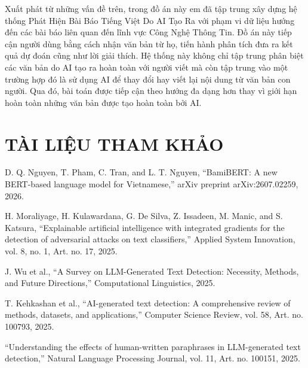 \documentclass[12pt,a4paper]{report}
\begin{document}
\vspace{\baselineskip}
\noindent
Xuất phát từ những vấn đề trên, trong đồ án này em đã tập trung xây dựng hệ thống Phát Hiện Bài Báo Tiếng Việt Do AI Tạo Ra với phạm vi dữ liệu hướng đến các bài báo liên quan đến lĩnh vực
Công Nghệ Thông Tin. Đồ án này tiếp cận người dùng bằng cách nhận văn bản từ họ, tiến hành phân tích đưa ra kết quả dự đoán cũng như lời giải thích. Hệ thống này không chỉ tập trung phân biệt các văn 
bản do AI tạo ra hoàn toàn với người viết mà còn tập trung vào một trường hợp đó là sử dụng AI để thay đổi hay viết lại nội dung từ văn bản con người. Qua đó, bài toán được tiếp cận theo hướng đa dạng hơn
thay vì giới hạn hoàn toàn những văn bản được tạo hoàn toàn bởi AI.

\clearpage
{}







\chapter*{TÀI LIỆU THAM KHẢO}
\begin{enumerate}[label={[\arabic*]}, leftmargin=1.2cm, labelsep=0.3cm, itemsep=0.45\baselineskip, topsep=0.2\baselineskip, parsep=0pt]
    \item D. Q. Nguyen, T. Pham, C. Tran, and L. T. Nguyen, “BamiBERT: A new BERT-based language model for Vietnamese,” arXiv preprint arXiv:2607.02259, 2026.
    \item H. Moraliyage, H. Kulawardana, G. De Silva, Z. Issadeen, M. Manic, and S. Katsura, “Explainable artificial intelligence with integrated gradients for the detection of adversarial attacks on text classifiers,” Applied System Innovation, vol. 8, no. 1, Art. no. 17, 2025.
    \item J. Wu et al., “A Survey on LLM-Generated Text Detection: Necessity, Methods, and Future Directions,” Computational Linguistics, 2025.
    \item T. Kehkashan et al., “AI-generated text detection: A comprehensive review of methods, datasets, and applications,” Computer Science Review, vol. 58, Art. no. 100793, 2025.
    \item “Understanding the effects of human-written paraphrases in LLM-generated text detection,” Natural Language Processing Journal, vol. 11, Art. no. 100151, 2025.
\end{enumerate}
\end{document}
